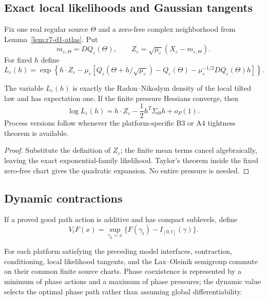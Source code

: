 \subsection{Exact local likelihoods and Gaussian tangents}

Fix one real regular source $\Theta$ and a zero-free complex neighborhood from
Lemma~\ref{lem:r7-d1-atlas}.  Put
\[
 m_{\varepsilon,\Theta}=DQ_\varepsilon(\Theta),
 \qquad
 Z_\varepsilon=\sqrt{\mu_\varepsilon}
 (X_\varepsilon-m_{\varepsilon,\Theta}).
\]
For fixed $h$ define
\[
 L_\varepsilon(h)=
 \exp\left\{
 h\cdot Z_\varepsilon
 -\mu_\varepsilon\left[
 Q_\varepsilon(\Theta+h/\sqrt{\mu_\varepsilon})
 -Q_\varepsilon(\Theta)
 -\mu_\varepsilon^{-1/2}DQ_\varepsilon(\Theta)h
 \right]\right\}.
\]

\begin{theorem}
\label{thm:r7-d1-likelihood}
The variable $L_\varepsilon(h)$ is exactly the Radon--Nikodym density of the
local tilted law and has expectation one.  If the finite pressure Hessians
converge, then
\[
 \log L_\varepsilon(h)
 =h\cdot Z_\varepsilon-\frac12h^T\Sigma_\Theta h+o_P(1).
\]
Process versions follow whenever the platform-specific B3 or A4 tightness
theorem is available.
\end{theorem}

\begin{proof}
Substitute the definition of $Z_\varepsilon$; the finite mean terms cancel
algebraically, leaving the exact exponential-family likelihood.  Taylor's
theorem inside the fixed zero-free chart gives the quadratic expansion.  No
entire pressure is needed.
\end{proof}

\subsection{Dynamic contractions}

If a proved good path action is additive and has compact sublevels, define
\[
 V_tF(x)=\sup_{\gamma_0=x}
 \{F(\gamma_t)-I_{[0,t]}(\gamma)\}.
\]

\begin{theorem}
\label{thm:r7-d1-dynamic}
For each platform satisfying the preceding model interfaces, contraction,
conditioning, local likelihood tangents, and the Lax--Oleinik semigroup commute
on their common finite source charts.  Phase coexistence is represented by a
minimum of phase actions and a maximum of phase pressures; the dynamic value
selects the optimal phase path rather than assuming global differentiability.
\end{theorem}

